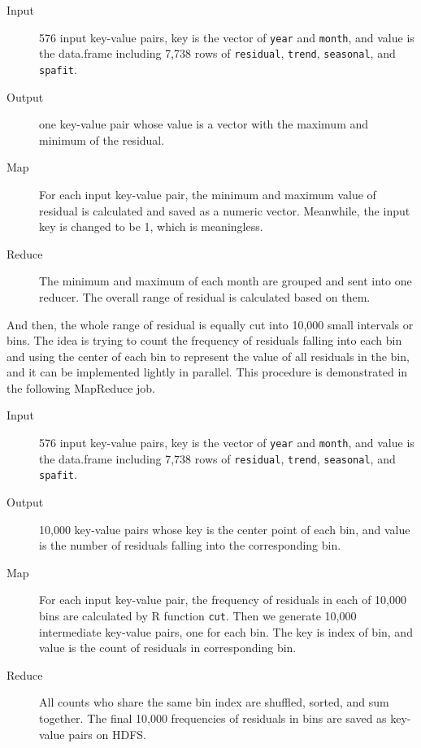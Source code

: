 \begin{description}
  \item[Input] 576 input key-value pairs, key is the vector of \texttt{year} and
  \texttt{month}, and value is the data.frame including 7,738 rows of 
  \texttt{residual}, \texttt{trend}, \texttt{seasonal}, and \texttt{spafit}.
  \item[Output] one key-value pair whose value is a vector with the maximum and
  minimum of the residual.
  \item[Map] For each input key-value pair, the minimum and maximum value of 
  residual is calculated and saved as a numeric vector. Meanwhile, the input
  key is changed to be 1, which is meaningless.
  \item[Reduce] The minimum and maximum of each month are grouped and sent into
  one reducer. The overall range of residual is calculated based on them.
\end{description}

And then, the whole range of residual is equally cut into 10,000 small intervals 
or bins. The idea is trying to count the frequency of residuals falling into each
bin and using the center of each bin to represent the value of all residuals in
the bin, and it can be implemented lightly in parallel. This procedure is 
demonstrated in the following MapReduce job.

\begin{description}
  \item[Input] 576 input key-value pairs, key is the vector of \texttt{year} and
  \texttt{month}, and value is the data.frame including 7,738 rows of 
  \texttt{residual}, \texttt{trend}, \texttt{seasonal}, and \texttt{spafit}.
  \item[Output] 10,000 key-value pairs whose key is the center point of each 
  bin, and value is the number of residuals falling into the corresponding bin.
  \item[Map] For each input key-value pair, the frequency of residuals in each
  of 10,000 bins are calculated by R function \texttt{cut}. Then we generate
  10,000 intermediate key-value pairs, one for each bin. The key is index of bin,
  and value is the count of residuals in corresponding bin. 
  \item[Reduce] All counts who share the same bin index are shuffled, sorted, and
  sum together. The final 10,000 frequencies of residuals in bins are saved as
  key-value pairs on HDFS.
\end{description}

